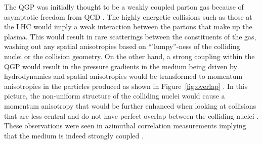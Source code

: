 %
%
%
%
%
%

The QGP was initially thought to be a weakly coupled parton gas because of asymptotic freedom from QCD \cite{PhysRevLett.34.1353}. The highly energetic collisions such as those at the LHC would 
imply a weak interaction between the partons that make up the plasma. This would result in rare scatterings between the constituents of the gas, washing out any spatial anisotropies based 
on ``'lumpy''-ness of the colliding nuclei or the collision geometry. On the other hand, a strong coupling within the QGP would result in the pressure gradients in the medium being driven by 
hydrodynamics and spatial anisotropies would be transformed to momentum anisotropies in the particles produced as shown in Figure~\ref{fig:overlap} \cite{Busza:2018rrf}. 
In this picture, the non-uniform structure of the colliding nuclei would cause a momentum anisotropy \cite{Ster:1999ib} that would be further enhanced when looking at collisions that are less central and do not 
have perfect overlap between the colliding nuclei \cite{Poskanzer:1999ea, Pinkenburg:1999ya}. These observations were seen in azimuthal correlation measurements implying that the medium is indeed strongly 
coupled \cite{Aaboud:2018ves, PhysRevLett.91.182301, Sirunyan:2017fts, PhysRevLett.116.132302}. 

